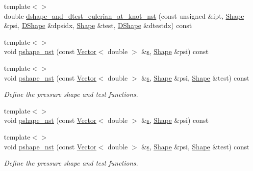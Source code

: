 \begin{DoxyCompactItemize}
\item 
{\footnotesize template$<$$>$ }\\double \hyperlink{classoomph_1_1PRefineableGeneralisedNewtonianQCrouzeixRaviartElement_a7c700df3e0225e2b5a26441730f5fb51}{dshape\+\_\+and\+\_\+dtest\+\_\+eulerian\+\_\+at\+\_\+knot\+\_\+nst} (const unsigned \&ipt, \hyperlink{classoomph_1_1Shape}{Shape} \&psi, \hyperlink{classoomph_1_1DShape}{D\+Shape} \&dpsidx, \hyperlink{classoomph_1_1Shape}{Shape} \&test, \hyperlink{classoomph_1_1DShape}{D\+Shape} \&dtestdx) const
\item 
{\footnotesize template$<$$>$ }\\void \hyperlink{classoomph_1_1PRefineableGeneralisedNewtonianQCrouzeixRaviartElement_a663ff5b7e858c491d8d77649ca555781}{pshape\+\_\+nst} (const \hyperlink{classoomph_1_1Vector}{Vector}$<$ double $>$ \&\hyperlink{cfortran_8h_ab7123126e4885ef647dd9c6e3807a21c}{s}, \hyperlink{classoomph_1_1Shape}{Shape} \&psi) const
\item 
{\footnotesize template$<$$>$ }\\void \hyperlink{classoomph_1_1PRefineableGeneralisedNewtonianQCrouzeixRaviartElement_a7d05683bf0896faeb1331a84b0add869}{pshape\+\_\+nst} (const \hyperlink{classoomph_1_1Vector}{Vector}$<$ double $>$ \&\hyperlink{cfortran_8h_ab7123126e4885ef647dd9c6e3807a21c}{s}, \hyperlink{classoomph_1_1Shape}{Shape} \&psi, \hyperlink{classoomph_1_1Shape}{Shape} \&test) const
\begin{DoxyCompactList}\small\item\em Define the pressure shape and test functions. \end{DoxyCompactList}\item 
{\footnotesize template$<$$>$ }\\void \hyperlink{classoomph_1_1PRefineableGeneralisedNewtonianQCrouzeixRaviartElement_a80e3fffb08dc9228fae0535d15cbc096}{pshape\+\_\+nst} (const \hyperlink{classoomph_1_1Vector}{Vector}$<$ double $>$ \&\hyperlink{cfortran_8h_ab7123126e4885ef647dd9c6e3807a21c}{s}, \hyperlink{classoomph_1_1Shape}{Shape} \&psi) const
\item 
{\footnotesize template$<$$>$ }\\void \hyperlink{classoomph_1_1PRefineableGeneralisedNewtonianQCrouzeixRaviartElement_a6774455a8d434b26b49c0a4957afa604}{pshape\+\_\+nst} (const \hyperlink{classoomph_1_1Vector}{Vector}$<$ double $>$ \&\hyperlink{cfortran_8h_ab7123126e4885ef647dd9c6e3807a21c}{s}, \hyperlink{classoomph_1_1Shape}{Shape} \&psi, \hyperlink{classoomph_1_1Shape}{Shape} \&test) const
\begin{DoxyCompactList}\small\item\em Define the pressure shape and test functions. \end{DoxyCompactList}\end{DoxyCompactItemize}
